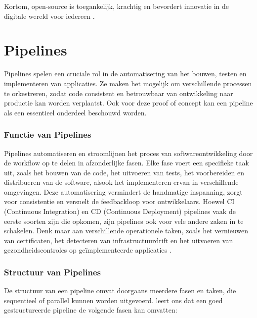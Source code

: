 Kortom, open-source is toegankelijk, krachtig en bevordert innovatie in de digitale wereld voor iedereen \autocite{OpenSource2006}.

\section{Pipelines}
\label{sec:pipelines}

Pipelines spelen een cruciale rol in de automatisering van het bouwen, testen en implementeren van applicaties. Ze maken het mogelijk om verschillende processen te orkestreren, zodat code consistent en betrouwbaar van ontwikkeling naar productie kan worden verplaatst. Ook voor deze proof of concept kan een pipeline als een essentieel onderdeel beschouwd worden.

\subsubsection{Functie van Pipelines}

Pipelines automatiseren en stroomlijnen het proces van softwareontwikkeling door de workflow op te delen in afzonderlijke fasen. Elke fase voert een specifieke taak uit, zoals het bouwen van de code, het uitvoeren van tests, het voorbereiden en distribueren van de software, alsook het implementeren ervan in verschillende omgevingen. Deze automatisering vermindert de handmatige inspanning, zorgt voor consistentie en versnelt de feedbackloop voor ontwikkelaars. Hoewel CI (Continuous Integration) en CD (Continuous Deployment) pipelines vaak de eerste soorten zijn die opkomen, zijn pipelines ook voor vele andere zaken in te schakelen. Denk maar aan verschillende operationele taken, zoals het vernieuwen van certificaten, het detecteren van infrastructuurdrift en het uitvoeren van gezondheidscontroles op geïmplementeerde applicaties \autocite{Merode2023}.

\subsubsection{Structuur van Pipelines}

De structuur van een pipeline omvat doorgaans meerdere fasen en taken, die sequentieel of parallel kunnen worden uitgevoerd. \textcite{Merode2023} leert ons dat een goed gestructureerde pipeline de volgende fasen kan omvatten:

